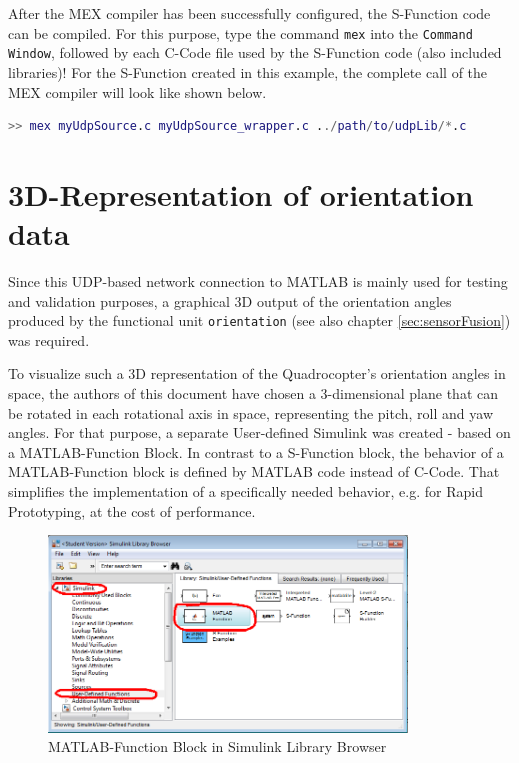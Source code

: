 After the MEX compiler has been successfully configured, the S-Function code can be compiled. For this purpose, type the command \texttt{mex} into the \texttt{Command Window}, followed by each C-Code file used by the S-Function code (also included libraries)! For the S-Function created in this example, the complete call of the MEX compiler will look like shown below.
\begin{lstlisting}[language=MATLAB]
>> mex myUdpSource.c myUdpSource_wrapper.c ../path/to/udpLib/*.c
\end{lstlisting}

\section{3D-Representation of orientation data}
\label{sec:udpMatlab:orientation3D}

Since this UDP-based network connection to MATLAB is mainly used for testing and validation purposes, a graphical 3D output of the orientation angles produced by the functional unit \texttt{orientation} (see also chapter \ref{sec:sensorFusion}) was required.

To visualize such a 3D representation of the Quadrocopter's orientation angles in space, the authors of this document have chosen a 3-dimensional plane that can be rotated in each rotational axis in space, representing the pitch, roll and yaw angles. For that purpose, a separate User-defined Simulink was created - based on a MATLAB-Function Block. In contrast to a S-Function block, the behavior of a MATLAB-Function block is defined by MATLAB code instead of C-Code. That simplifies the implementation of a specifically needed behavior, e.g. for Rapid Prototyping, at the cost of performance.

\begin{figure}[H]
    \centering
    \includegraphics[width=0.85\textwidth]{fig/ch-matlab-lib/matlabFunction}
    \caption{MATLAB-Function Block in Simulink Library Browser}
    \label{fig:udpMatlab:orientation3D:mFunc}
\end{figure}

